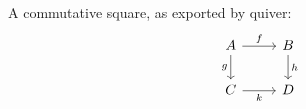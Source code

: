 \documentclass{article}
\begin{document}
A commutative square, as exported by quiver:
\[
  \begin{tikzcd}[ampersand replacement=\&]
    A \& B \\
    C \& D
    \arrow["f", from=1-1, to=1-2]
    \arrow["g"', from=1-1, to=2-1]
    \arrow["h", from=1-2, to=2-2]
    \arrow["k"', from=2-1, to=2-2]
  \end{tikzcd}
\]
\end{document}
